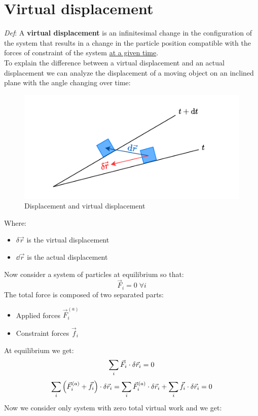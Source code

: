 \section{Virtual displacement}
\textit{Def}: A \textbf{virtual displacement} is an infinitesimal change in the configuration of the system that results in a change in the particle position compatible with the forces of constraint of the system \underline{at a given time}.\\
To explain the difference between a virtual displacement and an actual displacement we can analyze the displacement of a moving object on an inclined plane with the angle changing over time:
\begin{figure}[H]
  \centering
  \includegraphics[width=0.5\linewidth]{res/svg/virtualdisplacement.drawio}
  \caption{Displacement and virtual displacement}
  \label{fig:image8}
\end{figure}
Where:
\begin{itemize}
    \item $\delta \vec{r}$ is the virtual displacement
    \item $\dd{\vec{r}}$ is the actual displacement
\end{itemize}
Now consider a system of particles at equilibrium so that:
\begin{equation}
    \vec{F}_i = 0\;\forall i
\end{equation}
The total force is composed of two separated parts:
\begin{itemize}
    \item Applied forces $\vec{F}^{(a)}_i$
    \item Constraint forces $\vec{f}_i$
\end{itemize}
At equilibrium we get:
\begin{equation}
    \displaystyle\sum_i \vec{F}_i \cdot \delta \vec{r}_i = 0
\end{equation}
\begin{equation}
    \displaystyle\sum_i \left(\vec{F}^{(a)}_i + \vec{f}_i\right) \cdot \delta \vec{r}_i = \displaystyle\sum_i \vec{F}^{(a)}_i \cdot \delta \vec{r}_i + \displaystyle\sum_i \vec{f}_i \cdot \delta \vec{r}_i = 0
\end{equation}
Now we consider only system with zero total virtual work and we get:
